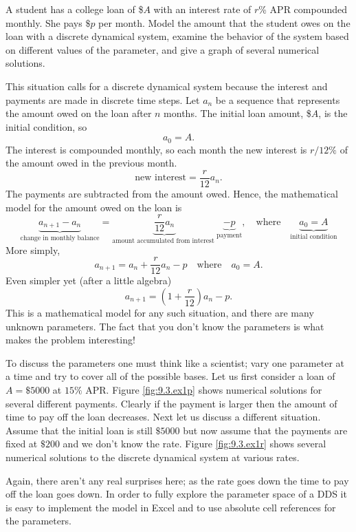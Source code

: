 \begin{example}
A student has a college loan of \$$A$ with an interest rate of $r$\% APR compounded monthly.  She pays
$\$p$ per month.  Model the amount that the student owes on the loan with a discrete
dynamical system, examine the behavior of the system based on different values of the
parameter, and give a graph of several numerical solutions.

This situation calls for a discrete dynamical system because the interest and payments are
made in discrete time steps.  Let $a_n$ be a sequence that represents the amount owed on
the loan after $n$ months.  The initial loan amount, \$$A$, is the initial condition, so
\[ a_0 = A. \]
The interest is compounded monthly, so each month the new interest is $r/12\%$ of the
amount owed in the previous month.
\[ \text{new interest} = \frac{r}{12} a_n. \]
The payments are subtracted from the amount owed.  Hence, the mathematical model for the
amount owed on the loan is
\[ \underbrace{a_{n+1}-a_n}_{\text{change in monthly balance}}  = \underbrace{\frac{r}{12}
a_n}_{\text{amount accumulated from interest }} \underbrace{- p}_{\text{payment}}, \quad
\text{where} \quad \underbrace{a_0 = A}_{\text{initial condition}} \]
More simply,
\[ a_{n+1} = a_n + \frac{r}{12} a_n - p \quad \text{where} \quad a_0 = A. \]
Even simpler yet (after a little algebra)
\[ a_{n+1} = \left( 1 + \frac{r}{12} \right) a_n - p. \]
This is a mathematical model for any such situation, and there are many unknown
parameters.  The fact that you don't know the parameters is what makes the problem
interesting!

To discuss the parameters one must think like a scientist; vary one parameter at a time
and try to cover all of the possible bases.  Let us first consider a loan of $A=\$5000$ at
$15\%$ APR.  Figure \ref{fig:9.3.ex1p} shows numerical solutions for several different
payments. Clearly if the payment is larger then the amount of time to pay off the loan
decreases.  
Next let us discuss a different situation.  Assume that the initial loan is still $\$5000$
but now assume that the payments are fixed at $\$200$ and we don't know the rate.  Figure
\ref{fig:9.3.ex1r} shows several numerical solutions to the discrete dynamical system at various rates.

Again, there aren't any real surprises here; as the rate goes down the time to pay off the
loan goes down.  In order to fully explore the parameter space of a DDS it is easy to
implement the model in Excel and to use absolute cell references for the parameters.  
\end{example}
